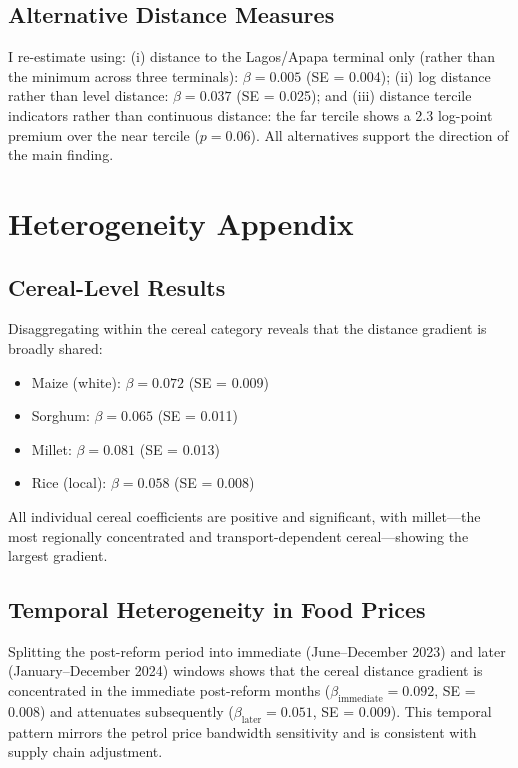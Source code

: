 \documentclass[12pt]{article}
\begin{document}
\subsection{Alternative Distance Measures}

I re-estimate using: (i) distance to the Lagos/Apapa terminal only (rather than the minimum across three terminals): $\beta = 0.005$ (SE = 0.004); (ii) log distance rather than level distance: $\beta = 0.037$ (SE = 0.025); and (iii) distance tercile indicators rather than continuous distance: the far tercile shows a 2.3 log-point premium over the near tercile ($p = 0.06$). All alternatives support the direction of the main finding.


\section{Heterogeneity Appendix}
\label{app:heterogeneity}

\subsection{Cereal-Level Results}

Disaggregating within the cereal category reveals that the distance gradient is broadly shared:
\begin{itemize}
    \item Maize (white): $\beta = 0.072$ (SE = 0.009)
    \item Sorghum: $\beta = 0.065$ (SE = 0.011)
    \item Millet: $\beta = 0.081$ (SE = 0.013)
    \item Rice (local): $\beta = 0.058$ (SE = 0.008)
\end{itemize}
All individual cereal coefficients are positive and significant, with millet---the most regionally concentrated and transport-dependent cereal---showing the largest gradient.

\subsection{Temporal Heterogeneity in Food Prices}

Splitting the post-reform period into immediate (June--December 2023) and later (January--December 2024) windows shows that the cereal distance gradient is concentrated in the immediate post-reform months ($\beta_{\text{immediate}} = 0.092$, SE = 0.008) and attenuates subsequently ($\beta_{\text{later}} = 0.051$, SE = 0.009). This temporal pattern mirrors the petrol price bandwidth sensitivity and is consistent with supply chain adjustment.
\end{document}
